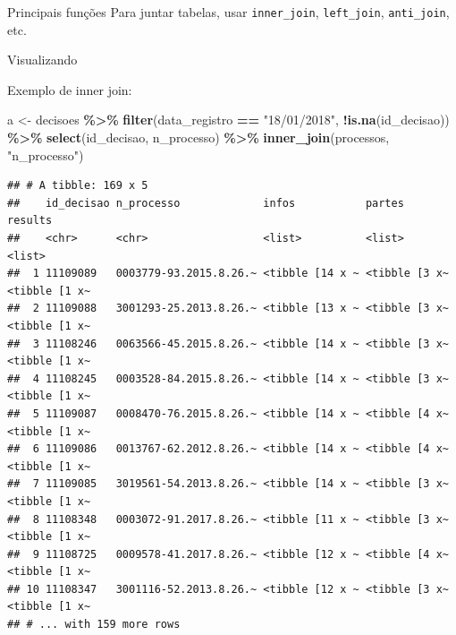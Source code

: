 \documentclass[
  9pt,
  ignorenonframetext,
]{beamer}
\newenvironment{Shaded}{\begin{snugshade}}{\end{snugshade}}
\newcommand{\KeywordTok}[1]{\textcolor[rgb]{0.13,0.29,0.53}{\textbf{#1}}}
\newcommand{\NormalTok}[1]{#1}
\newcommand{\OperatorTok}[1]{\textcolor[rgb]{0.81,0.36,0.00}{\textbf{#1}}}
\newcommand{\StringTok}[1]{\textcolor[rgb]{0.31,0.60,0.02}{#1}}
\begin{document}
\begin{frame}[fragile]{Principais funções}
\protect\hypertarget{principais-funuxe7uxf5es}{}
Para juntar tabelas, usar \texttt{inner\_join}, \texttt{left\_join},
\texttt{anti\_join}, etc.
\end{frame}

\begin{frame}{Visualizando}
\protect\hypertarget{visualizando}{}
\end{frame}

\begin{frame}[fragile]{Exemplo de inner join:}
\protect\hypertarget{exemplo-de-inner-join}{}
\begin{Shaded}
\begin{Highlighting}[]
\NormalTok{a \textless{}{-}}\StringTok{ }\NormalTok{decisoes }\OperatorTok{\%\textgreater{}\%}\StringTok{ }
\StringTok{  }\KeywordTok{filter}\NormalTok{(data\_registro }\OperatorTok{==}\StringTok{ "18/01/2018"}\NormalTok{, }\OperatorTok{!}\KeywordTok{is.na}\NormalTok{(id\_decisao)) }\OperatorTok{\%\textgreater{}\%}\StringTok{ }
\StringTok{  }\KeywordTok{select}\NormalTok{(id\_decisao, n\_processo) }\OperatorTok{\%\textgreater{}\%}\StringTok{ }
\StringTok{  }\KeywordTok{inner\_join}\NormalTok{(processos, }\StringTok{"n\_processo"}\NormalTok{)}
\end{Highlighting}
\end{Shaded}
\end{frame}

\begin{frame}[fragile]{}
\protect\hypertarget{section-5}{}
\begin{verbatim}
## # A tibble: 169 x 5
##    id_decisao n_processo             infos           partes        results      
##    <chr>      <chr>                  <list>          <list>        <list>       
##  1 11109089   0003779-93.2015.8.26.~ <tibble [14 x ~ <tibble [3 x~ <tibble [1 x~
##  2 11109088   3001293-25.2013.8.26.~ <tibble [13 x ~ <tibble [3 x~ <tibble [1 x~
##  3 11108246   0063566-45.2015.8.26.~ <tibble [14 x ~ <tibble [3 x~ <tibble [1 x~
##  4 11108245   0003528-84.2015.8.26.~ <tibble [14 x ~ <tibble [3 x~ <tibble [1 x~
##  5 11109087   0008470-76.2015.8.26.~ <tibble [14 x ~ <tibble [4 x~ <tibble [1 x~
##  6 11109086   0013767-62.2012.8.26.~ <tibble [14 x ~ <tibble [4 x~ <tibble [1 x~
##  7 11109085   3019561-54.2013.8.26.~ <tibble [14 x ~ <tibble [3 x~ <tibble [1 x~
##  8 11108348   0003072-91.2017.8.26.~ <tibble [11 x ~ <tibble [3 x~ <tibble [1 x~
##  9 11108725   0009578-41.2017.8.26.~ <tibble [12 x ~ <tibble [4 x~ <tibble [1 x~
## 10 11108347   3001116-52.2013.8.26.~ <tibble [12 x ~ <tibble [3 x~ <tibble [1 x~
## # ... with 159 more rows
\end{verbatim}
\end{frame}
\end{document}

